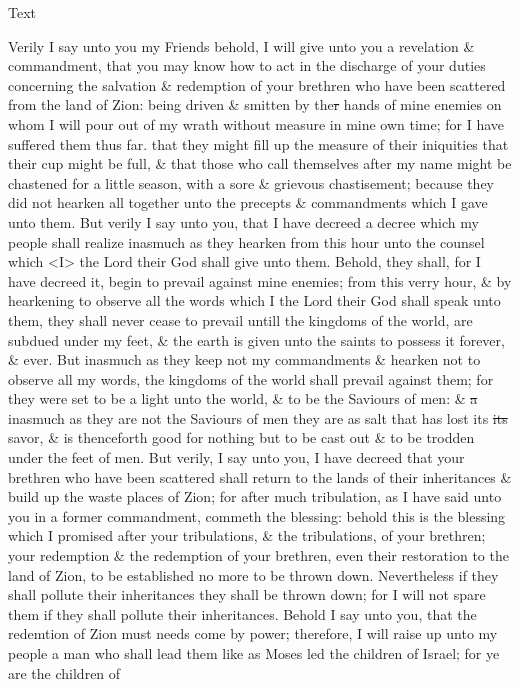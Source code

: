 				
				\begin{description}
					\item[Text]
				\end{description}
				
					Verily I say unto you my Friends behold, I will give unto you a revelation \& commandment, that you may know how to act in the discharge of your duties concerning the salvation \& redemption of your brethren who have been scattered from the land of Zion: being driven \& smitten by the\sout{r} hands of mine enemies on whom I will pour out of my wrath without measure in mine own time; for I have suffered them thus far. that they might fill up the measure of their iniquities that their cup might be full, \& that those who call themselves after my name might be chastened for a little season, with a sore \& grievous chastisement; because they did not hearken all together unto the precepts \& commandments which I gave unto them. But verily I say unto you, that I have decreed a decree which my people shall realize inasmuch as they hearken from this hour unto the counsel which <I> the Lord their God shall give unto them. Behold, they shall, for I have decreed it, begin to prevail against mine enemies; from this verry hour, \& by hearkening to observe all the words which I the Lord their God shall speak unto them, they shall never cease to prevail untill the kingdoms of the world, are subdued under my feet, \& the earth is given unto the saints to possess it forever, \& ever. But inasmuch as they keep not my commandments \& hearken not to observe all my words, the kingdoms of the world shall prevail against them; for they were set to be a light unto the world, \& to be the Saviours of men: \& \sout{a} inasmuch as they are not the Saviours of men they are as salt that has lost its \sout{its} savor, \& is thenceforth good for nothing but to be cast out \& to be trodden under the feet of men. But verily, I say unto you, I have decreed that your brethren who have been scattered shall return to the lands of their inheritances \& build up the waste places of Zion; for after much tribulation, as I have said unto you in a former commandment, commeth the blessing: behold this is the blessing which I promised after your tribulations, \& the tribulations, of your brethren; your redemption \& the redemption of your brethren, even their restoration to the land of Zion, to be established no more to be thrown down. Nevertheless if they shall pollute their inheritances they shall be thrown down; for I will not spare them if they shall pollute their inheritances. Behold I say unto you, that the redemtion of Zion must needs come by power; therefore, I will raise up unto my people a man who shall lead them like as Moses led the children of Israel; for ye are the children of 